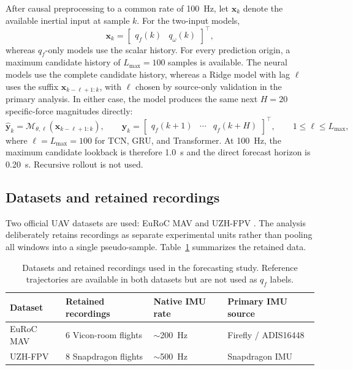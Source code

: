 \documentclass[preprint,12pt]{elsarticle}
\newcommand{\qf}{q_f}
\newcommand{\qw}{q_\omega}
\newcommand{\vect}[1]{\boldsymbol{#1}}
\begin{document}
After causal preprocessing to a common rate of \SI{100}{\hertz}, let $\vect{x}_k$ denote the available inertial input at sample $k$. For the two-input models,
\begin{equation}
\vect{x}_k=\begin{bmatrix}\qf(k) & \qw(k)\end{bmatrix}^{\top},
\end{equation}
whereas $\qf$-only models use the scalar history. For every prediction origin, a maximum candidate history of $L_{\max}=100$ samples is available. The neural models use the complete candidate history, whereas a Ridge model with lag $\ell$ uses the suffix $\vect{x}_{k-\ell+1:k}$, with $\ell$ chosen by source-only validation in the primary analysis. In either case, the model produces the same next $H=20$ specific-force magnitudes directly:
\begin{equation}
\widehat{\vect{y}}_k
=\mathcal{M}_{\theta,\ell}\!\left(\vect{x}_{k-\ell+1:k}\right),
\qquad
\vect{y}_k=
\begin{bmatrix}
\qf(k+1) & \cdots & \qf(k+H)
\end{bmatrix}^{\top},
\qquad
1\leq \ell\leq L_{\max},
\label{eq:forecast}
\end{equation}
where $\ell=L_{\max}=100$ for TCN, GRU, and Transformer. At \SI{100}{\hertz}, the maximum candidate lookback is therefore \SI{1.0}{\second} and the direct forecast horizon is \SI{0.20}{\second}. Recursive rollout is not used.

\subsection{Datasets and retained recordings}

Two official UAV datasets are used: EuRoC MAV \cite{Burri2016EuRoC} and UZH-FPV \cite{Delmerico2019UZHFPV}. The analysis deliberately retains recordings as separate experimental units rather than pooling all windows into a single pseudo-sample. Table~\ref{tab:datasets} summarizes the retained data.

\begin{table}[t]
\centering
\caption{Datasets and retained recordings used in the forecasting study. Reference trajectories are available in both datasets but are not used as $\qf$ labels.}
\label{tab:datasets}
\small
\begin{tabular}{llll}
\toprule
Dataset & Retained recordings & Native IMU rate & Primary IMU source \\
\midrule
EuRoC MAV & 6 Vicon-room flights & $\sim$\SI{200}{\hertz} & Firefly / ADIS16448 \\
UZH-FPV & 8 Snapdragon flights & $\sim$\SI{500}{\hertz} & Snapdragon IMU \\
\bottomrule
\end{tabular}
\end{table}
\end{document}
